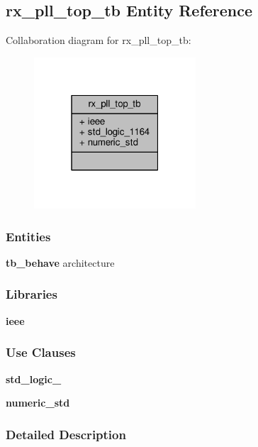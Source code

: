 \subsection{rx\+\_\+pll\+\_\+top\+\_\+tb Entity Reference}
\label{classrx__pll__top__tb}


Collaboration diagram for rx\+\_\+pll\+\_\+top\+\_\+tb\+:\nopagebreak
\begin{figure}[H]
\begin{center}
\leavevmode
\includegraphics[width=171pt]{d2/d10/classrx__pll__top__tb__coll__graph}
\end{center}
\end{figure}
\subsubsection*{Entities}
\begin{DoxyCompactItemize}
\item 
{\bf tb\+\_\+behave} architecture
\end{DoxyCompactItemize}
\subsubsection*{Libraries}
 \begin{DoxyCompactItemize}
\item 
{\bf ieee} 
\end{DoxyCompactItemize}
\subsubsection*{Use Clauses}
 \begin{DoxyCompactItemize}
\item 
{\bf std\+\_\+logic\+\_}   
\item 
{\bf numeric\+\_\+std}   
\end{DoxyCompactItemize}


\subsubsection{Detailed Description}



